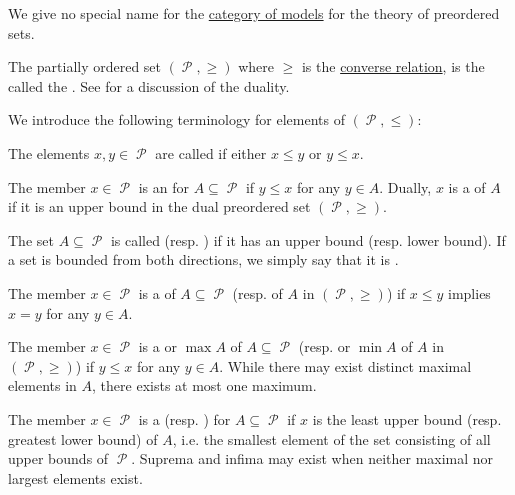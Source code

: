\begin{definition}
\begin{thmenum}[series=def:preordered_set]
     We give no special name for the \hyperref[def:category_of_first_order_models]{category of models} for the theory of preordered sets.

     The partially ordered set \( (\mscrP, \geq) \) where \( \geq \) is the \hyperref[def:binary_relation/converse]{converse relation}, is the called the . See  for a discussion of the duality.
  \end{thmenum}

  We introduce the following terminology for elements of \( (\mscrP, \leq) \):
  \begin{thmenum}[resume=def:preordered_set]
     The elements \( x, y \in \mscrP \) are called  if either \( x \leq y \) or \( y \leq x \).

     The member \( x \in \mscrP \) is an  for \( A \subseteq \mscrP \) if \( y \leq x \) for any \( y \in A \). Dually, \( x \) is a  of \( A \) if it is an upper bound in the dual preordered set \( (\mscrP, \geq) \).

     The set \( A \subseteq \mscrP \) is called  (resp. ) if it has an upper bound (resp. lower bound). If a set is bounded from both directions, we simply say that it is .

     The member \( x \in \mscrP \) is a  of \( A \subseteq \mscrP \) (resp.  of \( A \) in \( (\mscrP, \geq) \)) if \( x \leq y \) implies \( x = y \) for any \( y \in A \).

     The member \( x \in \mscrP \) is a  or  \( \max A \) of \( A \subseteq \mscrP \) (resp.  or  \( \min A \) of \( A \) in \( (\mscrP, \geq) \)) if \( y \leq x \) for any \( y \in A \). While there may exist distinct maximal elements in \( A \), there exists at most one maximum.

     The member \( x \in \mscrP \) is a  (resp. ) for \( A \subseteq \mscrP \) if \( x \) is the least upper bound (resp. greatest lower bound) of \( A \), i.e. the smallest element of the set consisting of all upper bounds of \( \mscrP \). Suprema and infima may exist when neither maximal nor largest elements exist.
  \end{thmenum}
\end{definition}

